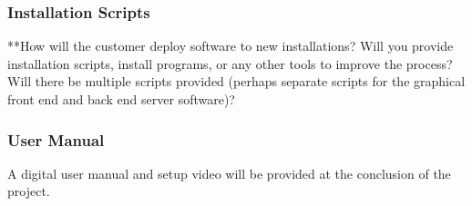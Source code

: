

\subsubsection{Installation Scripts}
**How will the customer deploy software to new installations? Will you provide installation scripts, install programs, or any other tools to improve the process? Will there be multiple scripts provided (perhaps separate scripts for the graphical front end and back end server software)? 

\subsubsection{User Manual}
A digital user manual and setup video will be provided at the conclusion of the project.
